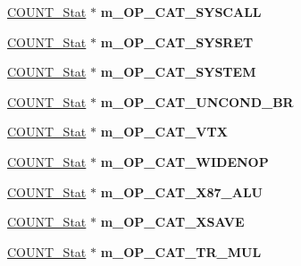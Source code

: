 \begin{DoxyCompactItemize}
\item 
\hypertarget{classall__stats__c_a1f1fe95eb1a37c1846e7a4455d6e1ed4}{
\hyperlink{classCOUNT__Stat}{COUNT\_\-Stat} $\ast$ {\bfseries m\_\-OP\_\-CAT\_\-SYSCALL}}
\label{classall__stats__c_a1f1fe95eb1a37c1846e7a4455d6e1ed4}

\item 
\hypertarget{classall__stats__c_ac320b7f3db53c670aa54e0c1271026c2}{
\hyperlink{classCOUNT__Stat}{COUNT\_\-Stat} $\ast$ {\bfseries m\_\-OP\_\-CAT\_\-SYSRET}}
\label{classall__stats__c_ac320b7f3db53c670aa54e0c1271026c2}

\item 
\hypertarget{classall__stats__c_a853361aea0619043e710d2661d591f26}{
\hyperlink{classCOUNT__Stat}{COUNT\_\-Stat} $\ast$ {\bfseries m\_\-OP\_\-CAT\_\-SYSTEM}}
\label{classall__stats__c_a853361aea0619043e710d2661d591f26}

\item 
\hypertarget{classall__stats__c_a686d9cb7570b805f683da90bf66663d1}{
\hyperlink{classCOUNT__Stat}{COUNT\_\-Stat} $\ast$ {\bfseries m\_\-OP\_\-CAT\_\-UNCOND\_\-BR}}
\label{classall__stats__c_a686d9cb7570b805f683da90bf66663d1}

\item 
\hypertarget{classall__stats__c_a5e104b4ac4685f4c45c70fb8adcdfa91}{
\hyperlink{classCOUNT__Stat}{COUNT\_\-Stat} $\ast$ {\bfseries m\_\-OP\_\-CAT\_\-VTX}}
\label{classall__stats__c_a5e104b4ac4685f4c45c70fb8adcdfa91}

\item 
\hypertarget{classall__stats__c_a6a1b2842611e51b48a96edf5c0f015b0}{
\hyperlink{classCOUNT__Stat}{COUNT\_\-Stat} $\ast$ {\bfseries m\_\-OP\_\-CAT\_\-WIDENOP}}
\label{classall__stats__c_a6a1b2842611e51b48a96edf5c0f015b0}

\item 
\hypertarget{classall__stats__c_ae4a818e4fda3e160b1cd392c9822a2a9}{
\hyperlink{classCOUNT__Stat}{COUNT\_\-Stat} $\ast$ {\bfseries m\_\-OP\_\-CAT\_\-X87\_\-ALU}}
\label{classall__stats__c_ae4a818e4fda3e160b1cd392c9822a2a9}

\item 
\hypertarget{classall__stats__c_a9d55489e111811c49f02a32b90855c68}{
\hyperlink{classCOUNT__Stat}{COUNT\_\-Stat} $\ast$ {\bfseries m\_\-OP\_\-CAT\_\-XSAVE}}
\label{classall__stats__c_a9d55489e111811c49f02a32b90855c68}

\item 
\hypertarget{classall__stats__c_afa083f7075f640e705b3b2a063972c3b}{
\hyperlink{classCOUNT__Stat}{COUNT\_\-Stat} $\ast$ {\bfseries m\_\-OP\_\-CAT\_\-TR\_\-MUL}}
\label{classall__stats__c_afa083f7075f640e705b3b2a063972c3b}


\end{DoxyCompactItemize}
